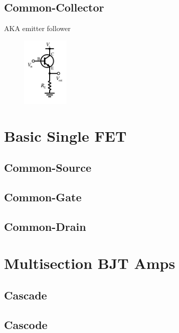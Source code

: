 \documentclass{report}
\newcommand{\imwidth}{0.2\textwidth}
\begin{document}
\section{Common-Collector}
AKA emitter follower
\begin{figure}
\centering
\includegraphics[width = \imwidth]{NPN_common_collector}
\caption{}
\end{figure}


\chapter{Basic Single FET}
\section{Common-Source}
\section{Common-Gate}
\section{Common-Drain}

\chapter{Multisection BJT Amps}
\section{Cascade}
\section{Cascode}
\end{document}
